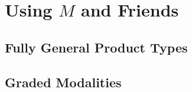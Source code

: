 \section{Using $M$ and Friends}

\subsection{Fully General Product Types}

\subsection{Graded Modalities}
